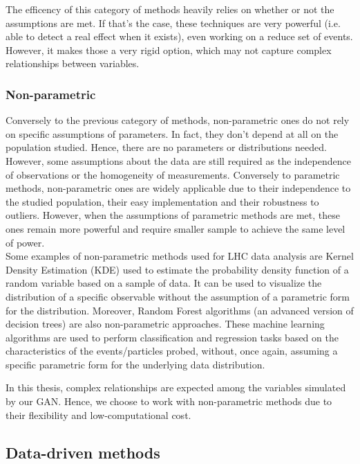 The efficency of this category of methods heavily relies on whether or not the assumptions are met. If that's the case, these techniques are very powerful (i.e. able to detect a real effect when it exists), even working on a reduce set of events. However, it makes those a very rigid option, which may not capture complex relationships between variables.

\subsubsection*{Non-parametric}

Conversely to the previous category of methods, non-parametric ones do not rely on specific assumptions of parameters. In fact, they don't depend at all on the population studied. Hence, there are no parameters or distributions needed. However, some assumptions about the data are still required as the independence of observations or the homogeneity of measurements.
Conversely to parametric methods, non-parametric ones are widely applicable due to their independence to the studied population, their easy implementation and their robustness to outliers.
However, when the assumptions of parametric methods are met, these ones remain more powerful and require smaller sample to achieve the same level of power.\\

Some examples of non-parametric methods used for LHC data analysis are Kernel Density Estimation (KDE) used to estimate the probability density function of a random variable based on a sample of data. It can be used to visualize the distribution of a specific observable without the assumption of a parametric form for the distribution. Moreover, Random Forest algorithms (an advanced version of decision trees) are also non-parametric approaches. These machine learning algorithms are used to perform classification and regression tasks based on the characteristics of the events/particles probed, without, once again, assuming a specific parametric form for the underlying data distribution.

In this thesis, complex relationships are expected among the variables simulated by our GAN. Hence, we choose to work with non-parametric methods due to their flexibility and low-computational cost.

\subsection{Data-driven methods}

